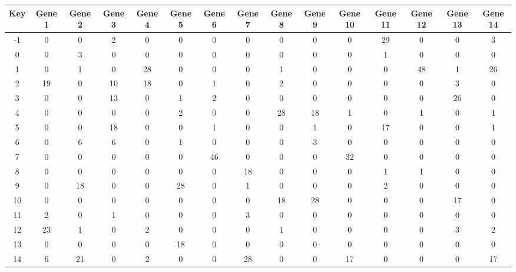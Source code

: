 \begin{tabular}{|c|c|c|c|c|c|c|c|c|c|c|c|c|c|c|}
\hline
Key & Gene 1 & Gene 2 & Gene 3 & Gene 4 & Gene 5 & Gene 6 & Gene 7 & Gene 8 & Gene 9 & Gene 10 & Gene 11 & Gene 12 & Gene 13 & Gene 14 \\
\hline
-1 & 0 & 0 & 2 & 0 & 0 & 0 & 0 & 0 & 0 & 0 & 29 & 0 & 0 & 3 \\
0 & 0 & 3 & 0 & 0 & 0 & 0 & 0 & 0 & 0 & 0 & 1 & 0 & 0 & 0 \\
1 & 0 & 1 & 0 & 28 & 0 & 0 & 0 & 1 & 0 & 0 & 0 & 48 & 1 & 26 \\
2 & 19 & 0 & 10 & 18 & 0 & 1 & 0 & 2 & 0 & 0 & 0 & 0 & 3 & 0 \\
3 & 0 & 0 & 13 & 0 & 1 & 2 & 0 & 0 & 0 & 0 & 0 & 0 & 26 & 0 \\
4 & 0 & 0 & 0 & 0 & 2 & 0 & 0 & 28 & 18 & 1 & 0 & 1 & 0 & 1 \\
5 & 0 & 0 & 18 & 0 & 0 & 1 & 0 & 0 & 1 & 0 & 17 & 0 & 0 & 1 \\
6 & 0 & 6 & 6 & 0 & 1 & 0 & 0 & 0 & 3 & 0 & 0 & 0 & 0 & 0 \\
7 & 0 & 0 & 0 & 0 & 0 & 46 & 0 & 0 & 0 & 32 & 0 & 0 & 0 & 0 \\
8 & 0 & 0 & 0 & 0 & 0 & 0 & 18 & 0 & 0 & 0 & 1 & 1 & 0 & 0 \\
9 & 0 & 18 & 0 & 0 & 28 & 0 & 1 & 0 & 0 & 0 & 2 & 0 & 0 & 0 \\
10 & 0 & 0 & 0 & 0 & 0 & 0 & 0 & 18 & 28 & 0 & 0 & 0 & 17 & 0 \\
11 & 2 & 0 & 1 & 0 & 0 & 0 & 3 & 0 & 0 & 0 & 0 & 0 & 0 & 0 \\
12 & 23 & 1 & 0 & 2 & 0 & 0 & 0 & 1 & 0 & 0 & 0 & 0 & 3 & 2 \\
13 & 0 & 0 & 0 & 0 & 18 & 0 & 0 & 0 & 0 & 0 & 0 & 0 & 0 & 0 \\
14 & 6 & 21 & 0 & 2 & 0 & 0 & 28 & 0 & 0 & 17 & 0 & 0 & 0 & 17 \\
\hline
\end{tabular}